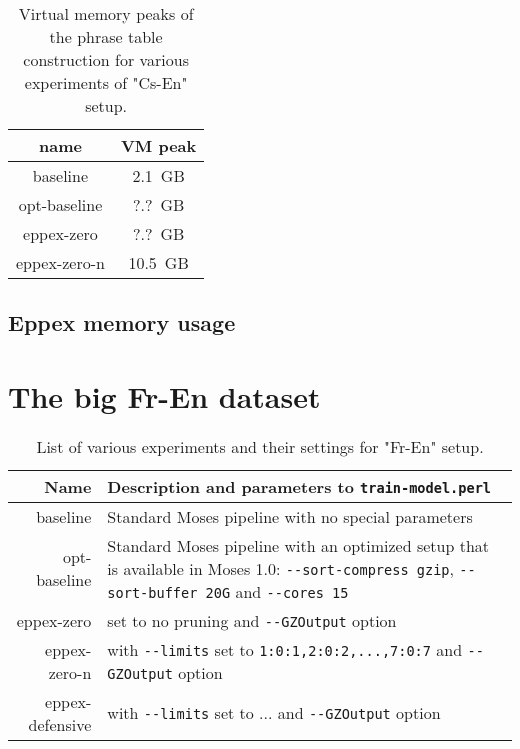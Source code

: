 \begin{table}[ht]
\centering
\begin{tabular}{ | c | c | }
\hline
name & VM peak \\
\hline
\hline
baseline      & 2.1~GB \\
opt-baseline  & ?.?~GB \\ %
eppex-zero    & ?.?~GB \\ %
\hline
eppex-zero-n  & 10.5~GB \\
\hline
\end{tabular}
\caption{\label{cs-en-wmt13-vm-peak-benchmarks}Virtual memory peaks of
the phrase table construction for various experiments of "Cs-En" setup.}
\end{table}

\subsection{Eppex memory usage}



\section{The big Fr-En dataset}

\begin{table}[ht]
\centering
\begin{tabular}{ r p{10cm} }
Name & Description and parameters to \verb|train-model.perl| \\
\hline
\hline
baseline & Standard Moses pipeline with no special parameters \\
opt-baseline & Standard Moses pipeline with an optimized setup that is
available in Moses 1.0:
\verb|--sort-compress gzip|, \verb|--sort-buffer 20G| and \verb|--cores 15| \\
eppex-zero       & \eppex{} set to no pruning and \verb|--GZOutput| option \\
eppex-zero-n     & \eppex{} with \verb|--limits| set to \verb|1:0:1,2:0:2,...,7:0:7|
and \verb|--GZOutput| option \\
eppex-defensive  & \eppex{} with \verb|--limits| set to ... %
and \verb|--GZOutput| option \\
\hline
\hline
\end{tabular}
\caption{\label{fr-en-80-scenarios}List of various experiments and their
settings for "Fr-En" setup.}
\end{table}


